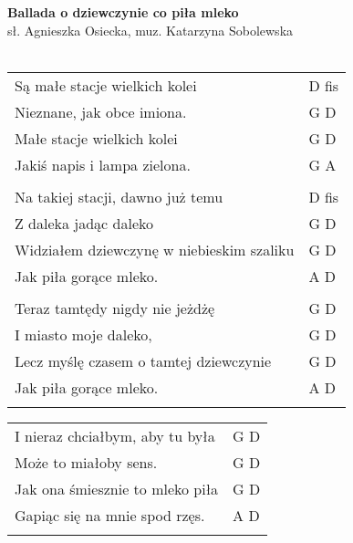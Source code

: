 \documentclass[a5paper]{article}
\begin{document}


\noindent
\fontsize{12pt}{15pt}\selectfont
\textbf{Ballada o dziewczynie co piła mleko} \\
\fontsize{8pt}{10pt}\selectfont
sł. Agnieszka Osiecka, muz. Katarzyna Sobolewska\\ \\
\fontsize{10pt}{12pt}\selectfont
{}
\begin{tabular}{@{}p{8.5cm}p{3cm}@{}}
\noindent
Są małe stacje wielkich kolei & D fis \\
Nieznane, jak obce imiona. & G D \\
Małe stacje wielkich kolei & G D \\
Jakiś napis i lampa zielona. & G A \\ \\

Na takiej stacji, dawno już temu & D fis \\
Z daleka jadąc daleko & G D \\
Widziałem dziewczynę w niebieskim szaliku & G D \\
Jak piła gorące mleko. & A D \\ \\

Teraz tamtędy nigdy nie jeżdżę & G D \\
I miasto moje daleko, & G D \\
Lecz myślę czasem o tamtej dziewczynie & G D \\
Jak piła gorące mleko. & A D \\ \\
\end{tabular}

\noindent
\begin{tabular}{@{}p{7.5cm}p{3cm}@{}}
I nieraz chciałbym, aby tu była & G D \\
Może to miałoby sens. & G D \\
Jak ona śmiesznie to mleko piła & G D \\
Gapiąc się na mnie spod rzęs. & A D \\ \\
\end{tabular}
\end{document}
